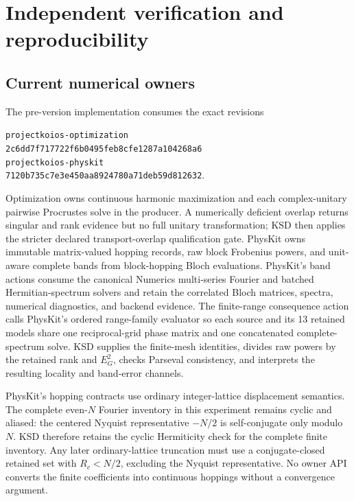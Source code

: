 \documentclass[11pt]{article}
\begin{document}
\section{Independent verification and reproducibility}

\subsection{Current numerical owners}

The pre-version implementation consumes the exact revisions
\begin{center}
\small
\texttt{projectkoios-optimization}\\
\texttt{2c6dd7f717722f6b0495feb8cfe1287a104268a6}\\[2pt]
\texttt{projectkoios-physkit}\\
\texttt{7120b735c7e3e450aa8924780a71deb59d812632}.
\end{center}
Optimization owns continuous harmonic maximization and each complex-unitary pairwise
Procrustes solve in the producer. A numerically deficient overlap returns singular and
rank evidence but no full unitary transformation; KSD then applies the stricter declared
transport-overlap qualification gate. PhysKit owns immutable matrix-valued hopping
records, raw block Frobenius powers, and unit-aware complete bands from block-hopping
Bloch evaluations. PhysKit's band actions consume the canonical Numerics multi-series Fourier and batched
Hermitian-spectrum solvers and retain the correlated Bloch matrices, spectra, numerical
diagnostics, and backend evidence. The finite-range consequence action calls PhysKit's
ordered range-family evaluator so each source and its 13 retained models share one
reciprocal-grid phase matrix and one concatenated complete-spectrum solve. KSD supplies the finite-mesh identities, divides raw
powers by the retained rank and $E_G^2$, checks Parseval consistency, and interprets the
resulting locality and band-error channels.

PhysKit's hopping contracts use ordinary integer-lattice displacement semantics. The
complete even-$N$ Fourier inventory in this experiment remains cyclic and aliased: the
centered Nyquist representative $-N/2$ is self-conjugate only modulo $N$. KSD therefore
retains the cyclic Hermiticity check for the complete finite inventory. Any later
ordinary-lattice truncation must use a conjugate-closed retained set with
$R_c<N/2$, excluding the Nyquist representative. No owner API converts the finite
coefficients into continuous hoppings without a convergence argument.
\end{document}
